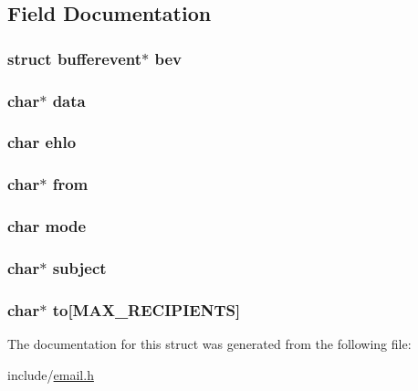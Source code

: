 \subsection{Field Documentation}
\hypertarget{structemail_a7a6bf7d3dd8ad7622482a90042e470ef}{
\subsubsection[{bev}]{\setlength{\rightskip}{0pt plus 5cm}struct bufferevent$\ast$ bev}}\label{structemail_a7a6bf7d3dd8ad7622482a90042e470ef}
\hypertarget{structemail_a91a70b77df95bd8b0830b49a094c2acb}{
\subsubsection[{data}]{\setlength{\rightskip}{0pt plus 5cm}char$\ast$ data}}\label{structemail_a91a70b77df95bd8b0830b49a094c2acb}
\hypertarget{structemail_ab6507ffd67fc6059c2aa721b7b8f8f03}{
\subsubsection[{ehlo}]{\setlength{\rightskip}{0pt plus 5cm}char ehlo}}\label{structemail_ab6507ffd67fc6059c2aa721b7b8f8f03}
\hypertarget{structemail_a765533dfc643627999c751f7e1514664}{
\subsubsection[{from}]{\setlength{\rightskip}{0pt plus 5cm}char$\ast$ from}}\label{structemail_a765533dfc643627999c751f7e1514664}
\hypertarget{structemail_a000e34997df38c2005a83d63e67d9282}{
\subsubsection[{mode}]{\setlength{\rightskip}{0pt plus 5cm}char mode}}\label{structemail_a000e34997df38c2005a83d63e67d9282}
\hypertarget{structemail_ae31ac864419a577c2982907c23b426d3}{
\subsubsection[{subject}]{\setlength{\rightskip}{0pt plus 5cm}char$\ast$ subject}}\label{structemail_ae31ac864419a577c2982907c23b426d3}
\hypertarget{structemail_a501cf38e14279529940ea1df44ca4535}{
\subsubsection[{to}]{\setlength{\rightskip}{0pt plus 5cm}char$\ast$ to\mbox{[}{\bf M\-A\-X\-\_\-\-R\-E\-C\-I\-P\-I\-E\-N\-T\-S}\mbox{]}}}\label{structemail_a501cf38e14279529940ea1df44ca4535}


The documentation for this struct was generated from the following file\-:\begin{DoxyCompactItemize}
\item 
include/\hyperlink{email_8h}{email.\-h}\end{DoxyCompactItemize}
